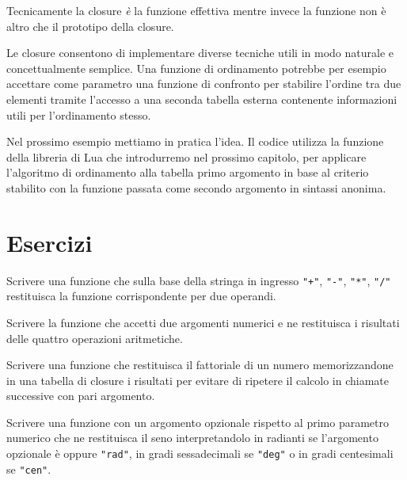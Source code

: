 Tecnicamente la closure \emph{è} la funzione effettiva mentre invece la
funzione non è altro che il prototipo della closure.

Le closure consentono di implementare diverse tecniche utili in modo naturale e
concettualmente semplice. Una funzione di ordinamento potrebbe per esempio
accettare come parametro una funzione di confronto per stabilire l'ordine tra
due elementi tramite l'accesso a una seconda tabella esterna contenente
informazioni utili per l'ordinamento stesso.

Nel prossimo esempio mettiamo in pratica l'idea. Il codice utilizza la funzione
 della libreria di Lua che introdurremo nel prossimo capitolo,
per applicare l'algoritmo di ordinamento alla tabella primo argomento in
base al criterio stabilito con la funzione passata come secondo
argomento in sintassi anonima.


\section{Esercizi}

\begin{Exercise}[label=fn-01]
Scrivere una funzione che sulla base della stringa in ingresso \verb|"+"|,
\verb|"-"|, \verb|"*"|, \verb|"/"| restituisca la funzione corrispondente per
due operandi.
\end{Exercise}

\begin{Exercise}[label=fn-02]
Scrivere la funzione che accetti due argomenti numerici e ne restituisca i
risultati delle quattro operazioni aritmetiche.
\end{Exercise}

\begin{Exercise}[label=fn-03]
Scrivere una funzione che restituisca il fattoriale di un numero memorizzandone
in una tabella di closure i risultati per evitare di ripetere il calcolo in
chiamate successive con pari argomento.
\end{Exercise}

\begin{Exercise}[label=fn-04]
Scrivere una funzione con un argomento opzionale rispetto al primo parametro
numerico che ne restituisca il seno interpretandolo in radianti se l'argomento
opzionale è  oppure \verb|"rad"|, in gradi sessadecimali se
\verb|"deg"| o in gradi centesimali se \verb|"cen"|.
\end{Exercise}

